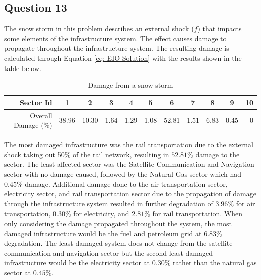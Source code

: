 \documentclass[11pt,a4paper]{article}
\begin{document}
\subsection*{Question 13}
The snow storm in this problem describes an external shock ($f$) that impacts some elements of the infrastructure system. The effect causes damage to propagate throughout the infrastructure system. The resulting damage is calculated through Equation \ref{eq: EIO Solution} with the results shown in the table below.
\begin{table}[H]
  \centering
  \caption{Damage from a snow storm}
    \begin{tabular}{r|rrrrrrrrrr}
    \toprule
    Sector Id & \multicolumn{1}{c}{1} & \multicolumn{1}{c}{2} & \multicolumn{1}{c}{3} & \multicolumn{1}{c}{4} & \multicolumn{1}{c}{5} & \multicolumn{1}{c}{6} & \multicolumn{1}{c}{7} & \multicolumn{1}{c}{8} & \multicolumn{1}{c}{9} & \multicolumn{1}{c}{10} \\
    \midrule
    Overall Damage (\%)      & 38.96 & 10.30 & 1.64 & 1.29 & 1.08 & 52.81 & 1.51 & 6.83 & 0.45 & 0 \\
    \bottomrule
    \end{tabular}%
  \label{tab: Snow storm 13}%
\end{table}%
The most damaged infrastructure was the rail transportation due to the external shock taking out 50\% of the rail network, resulting in $52.81\%$ damage to the sector. The least affected sector was the Satellite Communication and Navigation sector with no damage caused, followed by the Natural Gas sector which had $0.45\%$ damage.
Additional damage done to the air transportation sector, electricity sector, and rail transportation sector due to the propagation of damage through the infrastructure system resulted in further degradation of $3.96\%$ for air transportation, $0.30\%$ for electricity, and $2.81\%$ for rail transportation. When only considering the damage propagated throughout the system, the most damaged infrastructure would be the fuel and petroleum grid at $6.83\%$ degradation. The least damaged system does not change from the satellite communication and navigation sector but the second least damaged infrastructure would be the electricity sector at $0.30\%$ rather than the natural gas sector at $0.45\%$.
\end{document}
